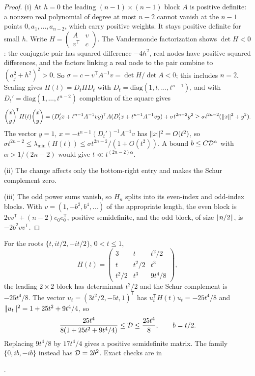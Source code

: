 \begin{proof}
(i) At $h=0$ the leading $(n-1)\times(n-1)$ block $A$ is positive definite: a nonzero real
polynomial of degree at most $n-2$ cannot vanish at the $n-1$ points $0,a_1,\dots,a_{n-2}$, which
carry positive weights. It stays positive definite for small $h$. Write
$H=\begin{pmatrix}A&v\\v^{\mathsf T}&c\end{pmatrix}$. The Vandermonde factorization shows $\det H<0$:
the conjugate pair has squared difference $-4h^2$, real nodes have positive squared differences,
and the factors linking a real node to the pair combine to $(a_j^2+h^2)^2>0$. So
$\sigma=c-v^{\mathsf T}A^{-1}v=\det H/\det A<0$; this includes $n=2$. Scaling gives
$H(t)=D_tHD_t$ with $D_t=\mathrm{diag}(1,t,\dots,t^{n-1})$, and with
$D_t'=\mathrm{diag}(1,\dots,t^{n-2})$ completion of the square gives
\[
 \binom xy^{\!\mathsf T}H(t)\binom xy=(D_t'x+t^{n-1}A^{-1}vy)^{\mathsf T}A(D_t'x+t^{n-1}A^{-1}vy)
 +\sigma t^{2n-2}y^2\ge\sigma t^{2n-2}(\lVert x\rVert^2+y^2).
\]
The vector $y=1$, $x=-t^{n-1}(D_t')^{-1}A^{-1}v$ has $\lVert x\rVert^2=O(t^2)$, so
$\sigma t^{2n-2}\le\lambda_{\min}(H(t))\le\sigma t^{2n-2}/(1+O(t^2))$. A bound $b\le C\mathcal{D}^\alpha$ with
$\alpha>1/(2n-2)$ would give $t\ll t^{(2n-2)\alpha}$.

(ii) The change affects only the bottom-right entry and makes the Schur complement zero.

(iii) The odd power sums vanish, so $H_n$ splits into its even-index and odd-index blocks. With
$v=(1,-b^2,b^4,\dots)$ of the appropriate length, the even block is
$2vv^{\mathsf T}+(n-2)e_0e_0^{\mathsf T}$, positive semidefinite, and the odd block, of size
$\lfloor n/2\rfloor$, is $-2b^2vv^{\mathsf T}$.
\end{proof}

\begin{example}\label{li:ex:hcubic}
For the roots $\{t,it/2,-it/2\}$, $0<t\le1$,
\[
 H(t)=\begin{pmatrix}3&t&t^2/2\\t&t^2/2&t^3\\t^2/2&t^3&9t^4/8\end{pmatrix},
\]
the leading $2\times2$ block has determinant $t^2/2$ and the Schur complement is $-25t^4/8$. The
vector $u_t=(3t^2/2,-5t,1)^{\mathsf T}$ has $u_t^{\mathsf T}H(t)u_t=-25t^4/8$ and
$\lVert u_t\rVert^2=1+25t^2+9t^4/4$, so
\[
 \frac{25t^4}{8(1+25t^2+9t^4/4)}\le\mathcal{D}\le\frac{25t^4}8,\qquad b=t/2 .
\]
Replacing $9t^4/8$ by $17t^4/4$ gives a positive semidefinite matrix. The family $\{0,ib,-ib\}$
instead has $\mathcal{D}=2b^2$. Exact checks are in
\begin{center}
.
\end{center}
\end{example}

